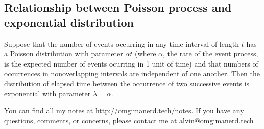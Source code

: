 \documentclass{math}
\begin{document}
\subsection*{Relationship between Poisson process and exponential distribution}
Suppose that the number of events occurring in any time interval of length
\( t \) has a Poisson distribution with parameter \( \alpha t \) (where
\( \alpha \), the rate of the event process, is the expected number of events
ocurring in 1 unit of time) and that numbers of occurrences in nonoverlapping
intervals are independent of one another. Then the distribution of elapsed time
between the occurrence of two successive events is exponential with parameter
\( \lambda = \alpha \).

\begin{center}
  You can find all my notes at \url{http://omgimanerd.tech/notes}. If you have
  any questions, comments, or concerns, please contact me at
  alvin@omgimanerd.tech
\end{center}
\end{document}
